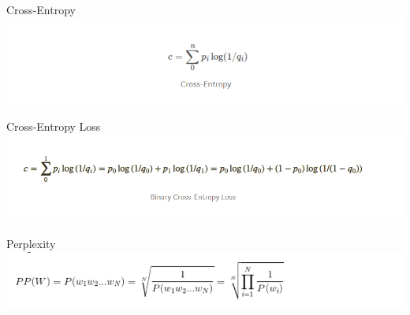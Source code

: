 \documentclass[t, 11pt]{beamer}
\begin{document}
\begin{frame}
	\frametitle{\insertsection}
	\frametitle{\insertsubsection}
	Cross-Entropy
	\includegraphics[width=1\linewidth]{cross_en.png}	
	
	\vspace{0.3cm}
	Cross-Entropy Loss
	\includegraphics[width=1\linewidth]{bi_loss.png}
\end{frame}

\begin{frame}
	\frametitle{\insertsection}
	\frametitle{\insertsubsection}
	Perplexity
	\includegraphics[width=1\linewidth]{perpl.png}	
	
\end{frame}




%
%  
\end{document}
